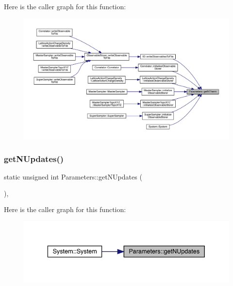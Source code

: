 Here is the caller graph for this function\+:\nopagebreak
\begin{figure}[H]
\begin{center}
\leavevmode
\includegraphics[width=350pt]{class_parameters_ad1f56cc1bb6c19f40454b30a5bc82da6_icgraph}
\end{center}
\end{figure}
\mbox{\label{class_parameters_ac10d294b56c295bdc7e8ea4fdccb917e}} 
\subsubsection{\texorpdfstring{getNUpdates()}{getNUpdates()}}
{\footnotesize\ttfamily static unsigned int Parameters\+::get\+N\+Updates (\begin{DoxyParamCaption}{ }\end{DoxyParamCaption})\hspace{0.3cm}{\ttfamily [inline]}, {\ttfamily [static]}}

Here is the caller graph for this function\+:\nopagebreak
\begin{figure}[H]
\begin{center}
\leavevmode
\includegraphics[width=336pt]{class_parameters_ac10d294b56c295bdc7e8ea4fdccb917e_icgraph}
\end{center}
\end{figure}
\mbox{\label{class_parameters_a5153ee54f768139539ebd3cc1a6f497d}} 
